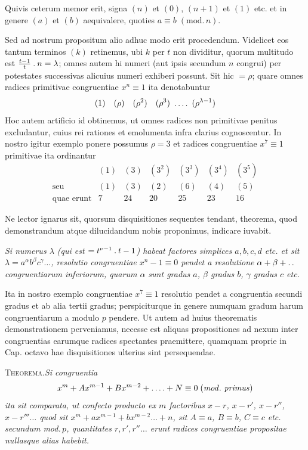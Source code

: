 %
Quivis ceterum memor erit, signa $(n)$ et $(0)$, $(n+1)$ et $(1)$ etc. et in genere $(a)$ et $(b)$ aequivalere, quoties $a\equiv b\;(\mathrm{mod.}\,n)$.

Sed ad nostrum propositum alio adhuc modo erit procedendum. Videlicet eos tantum terminos $(k)$ retinemus, ubi $k$ per $t$ non dividitur, quorum multitudo est $\frac{t-1}{t}\mathbin{.} n=\lambda$; omnes autem hi numeri (aut ipsis secundum $n$ congrui) per potestates successivas alicuius numeri exhiberi possunt. Sit hic $=\rho$; quare omnes radices primitivae congruentiae $x^n\equiv1$ ita denotabuntur
\[
(1)\quad(\rho)\quad(\rho^2)\quad(\rho^3)\ \dotsfour\ (\rho^{\lambda-1})
\]
Hoc autem artificio id obtinemus, ut omnes radices non primitivae penitus excludantur, cuius rei rationes et emolumenta infra clarius cognoscentur. In nostro igitur exemplo ponere possumus $\rho=3$ et radices congruentiae $x^7\equiv1$ primitivae ita ordinantur
\[
\begin{array}{rcccccc}
&(1)&(3)&(3^2)&(3^3)&(3^4)&(3^5)\\
\text{seu}&(1)&(3)&(2)&(6)&(4)&(5)\\
\text{quae erunt}&7&24&20&25&23&16
\end{array}
\]

Ne lector ignarus sit, quorsum disquisitiones sequentes tendant, theorema, quod demonstrandum atque dilucidandum nobis proponimus, indicare iuvabit.

\emph{Si numerus $\lambda$ (qui est $=t^{\nu-1}\mathbin{.} t-1$) habeat factores simplices $a,b,c,d$ etc. et sit $\lambda=a^\alpha b^\beta c^\gamma\ldots$, resolutio congruentiae $x^n-1\equiv0$ pendet a resolutione $\alpha+\beta+\mathinner{.\,.}$ congruentiarum inferiorum, quarum $\alpha$ sunt gradus $a$, $\beta$ gradus $b$, $\gamma$ gradus $c$ etc.}

Ita in nostro exemplo congruentiae $x^7\equiv1$ resolutio pendet a congruentia secundi gradus et ab alia tertii gradus; perspiciturque in genere numquam gradum harum congruentiarum a modulo $p$ pendere. Ut autem ad huius theorematis demonstrationem perveniamus, necesse est aliquas propositiones ad nexum inter congruentias earumque radices spectantes praemittere, quamquam proprie in Cap. octavo hae disquisitiones ulterius sint persequendae.

%
\textsc{Theorema.}\quad\emph{Si congruentia}
\[
x^m+Ax^{m-1}+Bx^{m-2}+\dotsfour+N\equiv0\;(\mathit{mod.\ primus})
\]
\emph{ita sit comparata, ut confecto producto ex $m$ factoribus $x-r$, $x-r'$, $x-r''$, $x-r'''\ldots$ quod sit $x^m+ax^{m-1}+bx^{m-2}\ldots+n$, sit $A\equiv a$, $B\equiv b$, $C\equiv c$ etc. secundum mod.\,$p$, quantitates $r,r',r''\ldots$ erunt radices congruentiae propositae nullasque alias habebit.}

